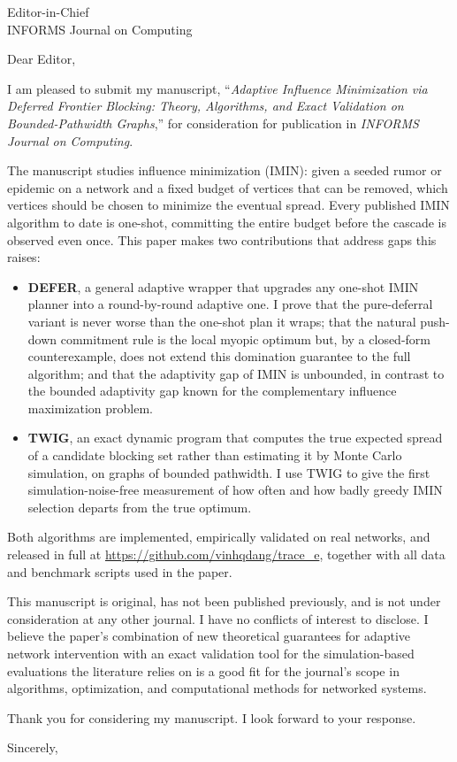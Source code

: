 \documentclass[11pt]{letter}
\begin{document}
\begin{letter}{Editor-in-Chief \\ INFORMS Journal on Computing}

\opening{Dear Editor,}

I am pleased to submit my manuscript, ``\textit{Adaptive Influence Minimization via Deferred Frontier Blocking: Theory, Algorithms, and Exact Validation on Bounded-Pathwidth Graphs},'' for consideration for publication in \textit{INFORMS Journal on Computing}.

The manuscript studies influence minimization (IMIN): given a seeded rumor or epidemic on a network and a fixed budget of vertices that can be removed, which vertices should be chosen to minimize the eventual spread. Every published IMIN algorithm to date is one-shot, committing the entire budget before the cascade is observed even once. This paper makes two contributions that address gaps this raises:

\begin{itemize}
\item \textbf{DEFER}, a general adaptive wrapper that upgrades any one-shot IMIN planner into a round-by-round adaptive one. I prove that the pure-deferral variant is never worse than the one-shot plan it wraps; that the natural push-down commitment rule is the local myopic optimum but, by a closed-form counterexample, does not extend this domination guarantee to the full algorithm; and that the adaptivity gap of IMIN is unbounded, in contrast to the bounded adaptivity gap known for the complementary influence maximization problem.
\item \textbf{TWIG}, an exact dynamic program that computes the true expected spread of a candidate blocking set rather than estimating it by Monte Carlo simulation, on graphs of bounded pathwidth. I use TWIG to give the first simulation-noise-free measurement of how often and how badly greedy IMIN selection departs from the true optimum.
\end{itemize}

Both algorithms are implemented, empirically validated on real networks, and released in full at \url{https://github.com/vinhqdang/trace_e}, together with all data and benchmark scripts used in the paper.

This manuscript is original, has not been published previously, and is not under consideration at any other journal. I have no conflicts of interest to disclose. I believe the paper's combination of new theoretical guarantees for adaptive network intervention with an exact validation tool for the simulation-based evaluations the literature relies on is a good fit for the journal's scope in algorithms, optimization, and computational methods for networked systems.

Thank you for considering my manuscript. I look forward to your response.

\closing{Sincerely,}

\end{letter}
\end{document}
